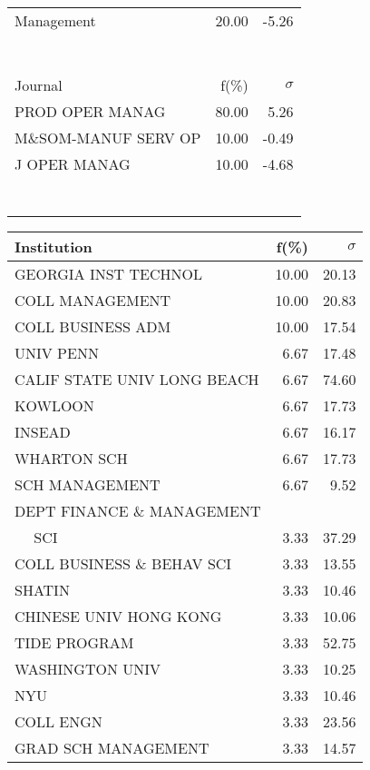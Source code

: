 \documentclass[a4paper,11pt]{report}
\begin{document}
\begin{landscape}
\begin{table}[!ht]
{\begin{tabular}{|l r r|}
Management & 20.00 & -5.26\\
 &  & \\
 &  & \\
 &  & \\
 &  & \\
 &  & \\
 &  & \\
 &  & \\
\hline
\hline
Journal & f(\%) & $\sigma$\\
\hline
PROD OPER MANAG & 80.00 & 5.26\\
M\&SOM-MANUF SERV OP & 10.00 & -0.49\\
J OPER MANAG & 10.00 & -4.68\\
 &  & \\
 &  & \\
 &  & \\
 &  & \\
 &  & \\
 &  & \\
 &  & \\
\hline
\end{tabular}
}
{\scriptsize\begin{tabular}{|l r r|}
\hline
Institution & f(\%) & $\sigma$\\
\hline
GEORGIA INST TECHNOL & 10.00 & 20.13\\
COLL MANAGEMENT & 10.00 & 20.83\\
COLL BUSINESS ADM & 10.00 & 17.54\\
UNIV PENN & 6.67 & 17.48\\
CALIF STATE UNIV LONG BEACH & 6.67 & 74.60\\
KOWLOON & 6.67 & 17.73\\
INSEAD & 6.67 & 16.17\\
WHARTON SCH & 6.67 & 17.73\\
SCH MANAGEMENT & 6.67 & 9.52\\
DEPT FINANCE \& MANAGEMENT &  & \\
$\quad$ SCI & 3.33 & 37.29\\
COLL BUSINESS \& BEHAV SCI & 3.33 & 13.55\\
SHATIN & 3.33 & 10.46\\
CHINESE UNIV HONG KONG & 3.33 & 10.06\\
TIDE PROGRAM & 3.33 & 52.75\\
WASHINGTON UNIV & 3.33 & 10.25\\
NYU & 3.33 & 10.46\\
COLL ENGN & 3.33 & 23.56\\
GRAD SCH MANAGEMENT & 3.33 & 14.57\\

\end{tabular}}
\end{table}
\end{landscape}
\end{document}
